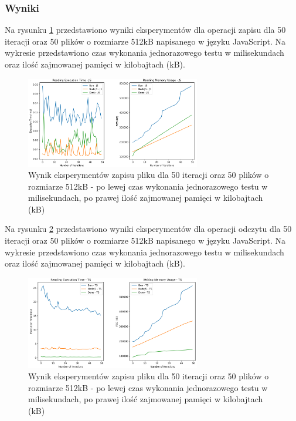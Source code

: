 \subsubsection{Wyniki}
Na rysunku \ref{fig:file_e1_reading_js} przedstawiono wyniki eksperymentów dla operacji zapisu dla 50 iteracji oraz 50 plików o rozmiarze 512kB napisanego w języku JavaScript. Na wykresie przedstawiono czas wykonania jednorazowego testu w milisekundach oraz ilość zajmowanej pamięci w kilobajtach (kB).

\begin{figure}[H]
  \centering
  \includegraphics[width=0.68\textwidth]{Figures/files/files_reading_50_500_50_js.png}
  \caption{Wynik eksperymentów zapisu pliku dla 50 iteracji oraz 50 plików o rozmiarze 512kB - po lewej czas wykonania jednorazowego testu w milisekundach, po prawej ilość zajmowanej pamięci w kilobajtach (kB)}
  \label{fig:file_e1_reading_js}
\end{figure}

Na rysunku \ref{fig:file_e1_writing_js} przedstawiono wyniki eksperymentów dla operacji odczytu dla 50 iteracji oraz 50 plików o rozmiarze 512kB napisanego w języku JavaScript. Na wykresie przedstawiono czas wykonania jednorazowego testu w milisekundach oraz ilość zajmowanej pamięci w kilobajtach (kB).

\begin{figure}[H]
  \centering
  \includegraphics[width=0.68\textwidth]{Figures/files/files_writing_50_500_50_ts.png}
  \caption{Wynik eksperymentów zapisu pliku dla 50 iteracji oraz 50 plików o rozmiarze 512kB - po lewej czas wykonania jednorazowego testu w milisekundach, po prawej ilość zajmowanej pamięci w kilobajtach (kB)}
  \label{fig:file_e1_writing_js}
\end{figure}

